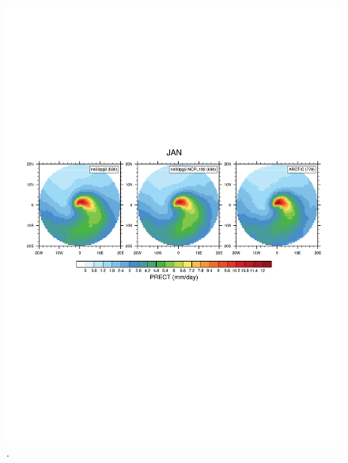 \documentclass[draft]{agujournal2019}
\begin{document}
\begin{figure}[t]
\begin{center}
         \includegraphics[width=130mm]{figs/temp_composite_ge45N_JAN-PRECT.pdf}
\end{center}
\caption{.}
\label{fig:comp-mean}
\end{figure}
\end{document}
